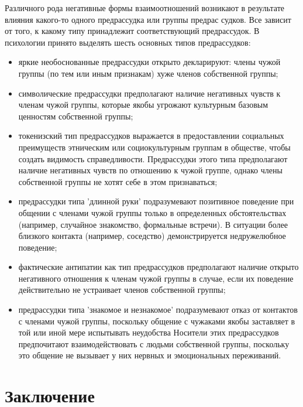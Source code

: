 \documentclass[14pt, a4paper] {ncc}
\begin{document}
Различного рода негативные формы взаимоотношений возникают в результате
влияния какого-то одного предрассудка или группы предрас судков. Все зависит
от того, к какому типу принадлежит соответствующий предрассудок. В психологии
принято выделять шесть основных типов предрассудков:

	\begin{itemize}
    	\item яркие необоснованные предрассудки открыто декларируют: члены чужой группы (по тем или иным признакам) хуже членов собственной группы;
    	\item символические предрассудки предполагают наличие негативных чувств к членам чужой группы, которые якобы угрожают культурным базовым ценностям собственной группы;
    	\item токенизский тип предрассудков выражается в предоставлении социальных преимуществ этническим или социокультурным группам в обществе, чтобы создать видимость справедливости. Предрассудки этого типа предполагают наличие негативных чувств по отношению к чужой группе, однако члены собственной группы не хотят себе в этом признаваться;
    	\item предрассудки типа 'длинной руки' подразумевают позитивное поведение при общении с членами чужой группы только в определенных обстоятельствах (например, случайное знакомство, формальные встречи). В ситуации более близкого контакта (например, соседство) демонстрируется недружелюбное поведение;
    	\item фактические антипатии как тип предрассудков предполагают наличие открыто негативного отношения к членам чужой группы в случае, если их поведение действительно не устраивает членов собственной группы;
    	\item предрассудки типа 'знакомое и незнакомое' подразумевают отказ от контактов с членами чужой группы, поскольку общение с чужаками якобы заставляет в той или иной мере испытывать неудобства Носители этих предрассудков предпочитают взаимодействовать с людьми собственной группы, поскольку это общение не вызывает у них нервных и эмоциональных переживаний.\cite{Sadoh}
	\end{itemize}
\newpage
\section{Заключение}
\end{document}
